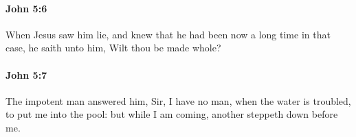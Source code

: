 		\paragraph{John 5:6} %
			\label{JOHN-5-6}

			When Jesus saw him lie, and knew that he had been now a long time in that case, he saith unto him, Wilt thou be made whole?

			\begin{framed}
			\scriptsize
				\begin{compactdesc}
					\item[SBLG] 
				\end{compactdesc}
			\end{framed}

		\paragraph{John 5:7} %
			\label{JOHN-5-7}

			The impotent man answered him, Sir, I have no man, when the water is troubled, to put me into the pool: but while I am coming, another steppeth down before me.

